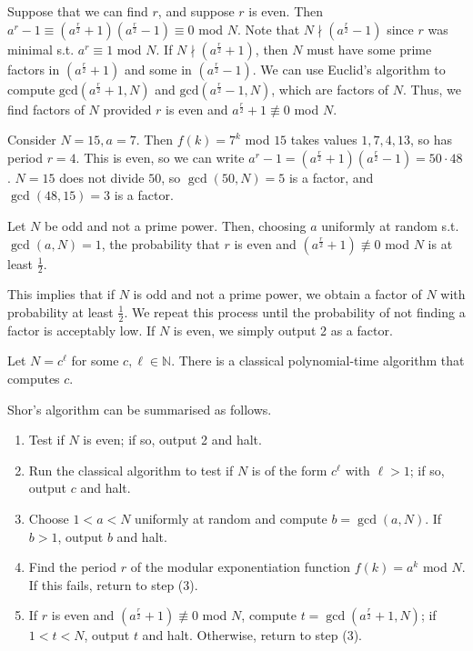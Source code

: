 Suppose that we can find $r$, and suppose $r$ is even.
Then $a^r - 1 \equiv (a^{\frac{r}{2}}+1)(a^{\frac{r}{2}}-1) \equiv 0$ mod $N$.
Note that $N \nmid (a^{\frac{r}{2}}-1)$ since $r$ was minimal s.t. $a^r \equiv 1$ mod $N$.
If $N \nmid (a^{\frac{r}{2}}+1)$, then $N$ must have some prime factors in $(a^{\frac{r}{2}}+1)$ and some in $(a^{\frac{r}{2}}-1)$.
We can use Euclid's algorithm to compute $\mathrm{gcd}(a^{\frac{r}{2}}+1, N)$ and $\mathrm{gcd}(a^{\frac{r}{2}}-1, N)$, which are factors of $N$.
Thus, we find factors of $N$ provided $r$ is even and $a^{\frac{r}{2}} + 1 \not\equiv 0$ mod $N$.

Consider $N = 15, a = 7$.
Then $f(k) = 7^k$ mod $15$ takes values $1, 7, 4, 13$, so has period $r = 4$.
This is even, so we can write $a^r - 1 = (a^{\frac{r}{2}} + 1)(a^{\frac{r}{2}} - 1) = 50 \cdot 48$.
$N = 15$ does not divide $50$, so $\gcd(50, N) = 5$ is a factor, and $\gcd(48, 15) = 3$ is a factor.
\begin{theorem}
    Let $N$ be odd and not a prime power.
    Then, choosing $a$ uniformly at random s.t. $\gcd(a,N) = 1$, the probability that $r$ is even and $(a^{\frac{r}{2}} + 1) \not\equiv 0$ mod $N$ is at least $\frac{1}{2}$.
\end{theorem}
This implies that if $N$ is odd and not a prime power, we obtain a factor of $N$ with probability at least $\frac{1}{2}$.
We repeat this process until the probability of not finding a factor is acceptably low.
If $N$ is even, we simply output 2 as a factor.
\begin{lemma}
    Let $N = c^\ell$ for some $c, \ell \in \mathbb N$.
    There is a classical polynomial-time algorithm that computes $c$.
\end{lemma}
Shor's algorithm can be summarised as follows.
\begin{enumerate}
    \item Test if $N$ is even; if so, output 2 and halt.
    \item Run the classical algorithm to test if $N$ is of the form $c^\ell$ with $\ell > 1$; if so, output $c$ and halt.
    \item Choose $1 < a < N$ uniformly at random and compute $b = \gcd(a,N)$.
    If $b > 1$, output $b$ and halt.
    \item Find the period $r$ of the modular exponentiation function $f(k) = a^k$ mod $N$.
    If this fails, return to step (3).
    \item If $r$ is even and $(a^{\frac{r}{2}} + 1) \not\equiv 0$ mod $N$, compute $t = \gcd(a^{\frac{r}{2}} + 1, N)$; if $1 < t < N$, output $t$ and halt.
    Otherwise, return to step (3).
\end{enumerate}
